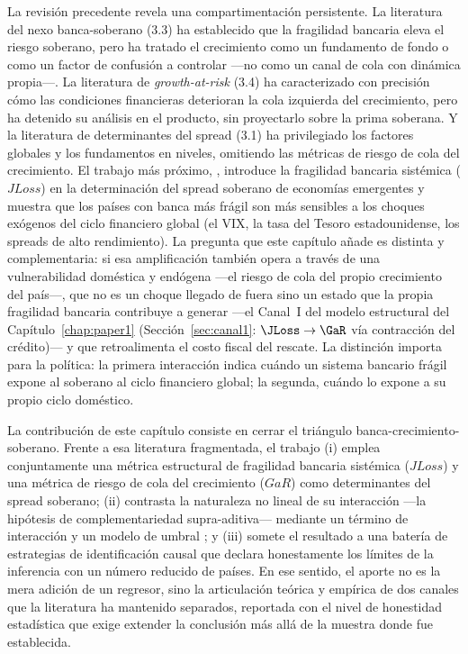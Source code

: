La revisión precedente revela una compartimentación persistente. La literatura del nexo banca-soberano (3.3) ha establecido que la fragilidad bancaria eleva el riesgo soberano, pero ha tratado el crecimiento como un fundamento de fondo o como un factor de confusión a controlar —no como un canal de cola con dinámica propia—. La literatura de \textit{growth-at-risk} (3.4) ha caracterizado con precisión cómo las condiciones financieras deterioran la cola izquierda del crecimiento, pero ha detenido su análisis en el producto, sin proyectarlo sobre la prima soberana. Y la literatura de determinantes del spread (3.1) ha privilegiado los factores globales y los fundamentos en niveles, omitiendo las métricas de riesgo de cola del crecimiento. El trabajo más próximo, \citet{Chari2024b}, introduce la fragilidad bancaria sistémica ($JLoss$) en la determinación del spread soberano de economías emergentes y muestra que los países con banca más frágil son más sensibles a los choques exógenos del ciclo financiero global (el VIX, la tasa del Tesoro estadounidense, los spreads de alto rendimiento). La pregunta que este capítulo añade es distinta y complementaria: si esa amplificación también opera a través de una vulnerabilidad doméstica y endógena —el riesgo de cola del propio crecimiento del país—, que no es un choque llegado de fuera sino un estado que la propia fragilidad bancaria contribuye a generar —el Canal~I del modelo estructural del Capítulo~\ref{chap:paper1} (Sección~\ref{sec:canal1}: $\JLoss\to\GaR$ vía contracción del crédito)— y que retroalimenta el costo fiscal del rescate. La distinción importa para la política: la primera interacción indica cuándo un sistema bancario frágil expone al soberano al ciclo financiero global; la segunda, cuándo lo expone a su propio ciclo doméstico.

La contribución de este capítulo consiste en cerrar el triángulo banca-crecimiento-soberano. Frente a esa literatura fragmentada, el trabajo (i) emplea conjuntamente una métrica estructural de fragilidad bancaria sistémica ($JLoss$) y una métrica de riesgo de cola del crecimiento ($GaR$) como determinantes del spread soberano; (ii) contrasta la naturaleza no lineal de su interacción —la hipótesis de complementariedad supra-aditiva— mediante un término de interacción y un modelo de umbral \citep{Hansen2000}; y (iii) somete el resultado a una batería de estrategias de identificación causal que declara honestamente los límites de la inferencia con un número reducido de países. En ese sentido, el aporte no es la mera adición de un regresor, sino la articulación teórica y empírica de dos canales que la literatura ha mantenido separados, reportada con el nivel de honestidad estadística que exige extender la conclusión más allá de la muestra donde fue establecida.

